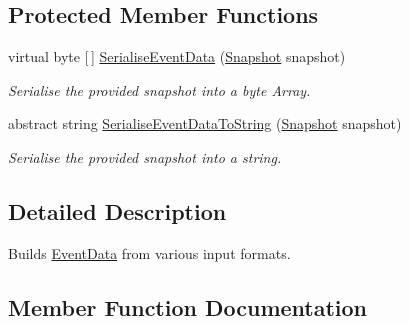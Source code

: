 \subsection*{Protected Member Functions}
\begin{DoxyCompactItemize}
\item 
virtual byte \mbox{[}$\,$\mbox{]} \hyperlink{classCqrs_1_1Events_1_1SnapshotBuilder_a50faca2f63b36d02d9733249449f3baf_a50faca2f63b36d02d9733249449f3baf}{Serialise\+Event\+Data} (\hyperlink{classCqrs_1_1Snapshots_1_1Snapshot}{Snapshot} snapshot)
\begin{DoxyCompactList}\small\item\em Serialise the provided {\itshape snapshot}  into a byte Array. \end{DoxyCompactList}\item 
abstract string \hyperlink{classCqrs_1_1Events_1_1SnapshotBuilder_a68fb9e6a5f6f78c01df6802a7f45387f_a68fb9e6a5f6f78c01df6802a7f45387f}{Serialise\+Event\+Data\+To\+String} (\hyperlink{classCqrs_1_1Snapshots_1_1Snapshot}{Snapshot} snapshot)
\begin{DoxyCompactList}\small\item\em Serialise the provided {\itshape snapshot}  into a string. \end{DoxyCompactList}\end{DoxyCompactItemize}


\subsection{Detailed Description}
Builds \hyperlink{classCqrs_1_1Events_1_1EventData}{Event\+Data} from various input formats. 



\subsection{Member Function Documentation}
\mbox{\label{classCqrs_1_1Events_1_1SnapshotBuilder_a1329007abf3aa02e4cddbebc669e4209_a1329007abf3aa02e4cddbebc669e4209}} 
